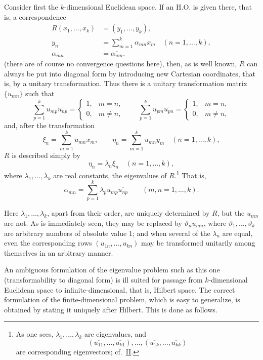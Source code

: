 ﻿\documentclass[paper=b5,fontsize=13pt,bookmarkpackage=false,twoside]{scrartcl}
\begin{document}
Consider first the $k$-dimensional Euclidean space. If an H.O. is given there, that is, a correspondence
\begin{align*}
 R(x_1,\ldots,x_k)&=(y_1,\ldots,y_k),\\
 y_n&=\sum_{m=1}^{k}\alpha_{mn}x_m
 \quad(n=1,\ldots,k),\\
 \alpha_{mn}&=\overline{\alpha_{nm}}.
\end{align*}
(there are of course no convergence questions here), then, as is well known, $R$ can always be put into diagonal form by introducing new Cartesian coordinates, that is, by a unitary transformation. Thus there is a unitary transformation matrix $\{u_{mn}\}$ such that
\[
 \sum_{p=1}^{k}u_{mp}\overline{u_{np}}
 =
 \begin{cases}
 1,&m=n,\\
 0,&m\ne n,
 \end{cases}
 \qquad
 \sum_{p=1}^{k}u_{pm}\overline{u_{pn}}
 =
 \begin{cases}
 1,&m=n,\\
 0,&m\ne n,
 \end{cases}
\]
and, after the transformation
\[
 \xi_n=\sum_{m=1}^{k}u_{mn}x_m,
 \qquad
 \eta_n=\sum_{m=1}^{k}u_{mn}y_m
 \quad(n=1,\ldots,k),
\]
$R$ is described simply by
\[
 \eta_n=\lambda_n\xi_n
 \quad(n=1,\ldots,k),
\]
where $\lambda_1,\ldots,\lambda_k$ are real constants, the eigenvalues of $R$.\footnote{\label{fn:source-13}As one sees, $\lambda_1,\ldots,\lambda_k$ are eigenvalues, and
\[
 (\overline{u_{11}},\ldots,\overline{u_{k1}}),\ldots,
 (\overline{u_{1k}},\ldots,\overline{u_{kk}})
\]
are corresponding eigenvectors; cf.\ \hyperref[intro:II]{II}.} That is,
\[
 \alpha_{mn}
 =\sum_{p=1}^{k}\lambda_pu_{mp}\overline{u_{np}}
 \qquad(m,n=1,\ldots,k).
\]

Here $\lambda_1,\ldots,\lambda_k$, apart from their order, are uniquely determined by $R$, but the $u_{mn}$ are not. As is immediately seen, they may be replaced by $\vartheta_nu_{mn}$, where $\vartheta_1,\ldots,\vartheta_k$ are arbitrary numbers of absolute value $1$; and when several of the $\lambda_n$ are equal, even the corresponding rows $(u_{1n},\ldots,u_{kn})$ may be transformed unitarily among themselves in an arbitrary manner.

An ambiguous formulation of the eigenvalue problem such as this one (transformability to diagonal form) is ill suited for passage from $k$-dimensional Euclidean space to infinite-dimensional, that is, Hilbert space. The correct formulation of the finite-dimensional problem, which is easy to generalize, is obtained by stating it uniquely after Hilbert. This is done as follows.
\end{document}
